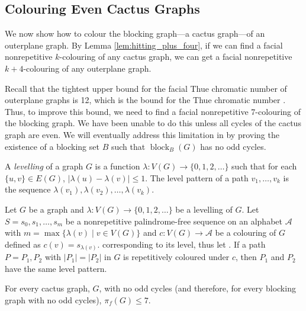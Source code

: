 \documentclass{patmorin}
\DeclareMathOperator{\block}{block}
\begin{document}
\subsection{Colouring Even Cactus Graphs}

We now show how to colour the blocking graph---a cactus graph---of an
outerplane graph.  By Lemma \ref{lem:hitting_plus_four}, if we can find
a facial nonrepetitive $k$-colouring of any cactus graph, we can get a
facial nonrepetitive $k+4$-colouring of any outerplane graph.

Recall that the tightest upper bound for the facial Thue chromatic number
of outerplane graphs is 12, which is the bound for the Thue chromatic
number \cite{barat2007square, kundgen2008nonrepetitive}. Thus, to improve
this bound, we need to find a facial nonrepetitive 7-colouring of the
blocking graph. We have been unable to do this unless all cycles of the
cactus graph are even.  We will eventually address this limitation in
 by proving the existence of a blocking set
$B$ such that $\block_B(G)$ has no odd cycles.

A \emph{levelling} of a graph $G$ is a function $\lambda\colon
V(G)\to \{0, 1, 2,\dots\}$ such that for each $\{u,v\}\in
E(G)$, $|\lambda(u)-\lambda(v)|\leq 1$. The level
pattern of a path $v_1,\ldots,v_k$ is the sequence
$\lambda(v_1),\lambda(v_2),\ldots,\lambda(v_k)$.

\begin{lem} 
 Let $G$ be a graph and $\lambda\colon V(G)\to \{0, 1,
 2,\dots\}$ be a levelling of $G$. Let $S=s_0,s_1,\ldots,s_m$
 be a nonrepetitive palindrome-free sequence on an alphabet
 $\mathcal{A}$ with $m=\max\{\lambda(v) \;|\; v \in V(G)\}$ and
 $c : V(G) \rightarrow \mathcal{A}$ be a colouring of $G$ defined
 as $c(v)=s_{\lambda(v)}$. %
 corresponding to its level, thus let .  If a path $P=P_1, P_2$ with
 $|P_1|=|P_2|$ in $G$ is repetitively coloured under $c$, then $P_1$
 and $P_2$ have the same level pattern.
\end{lem}

\begin{lem}
  For every cactus graph, $G$, with no odd cycles (and therefore, for
  every blocking graph with no odd cycles), $\pi_f(G)\le 7$.
\end{lem}
\end{document}
